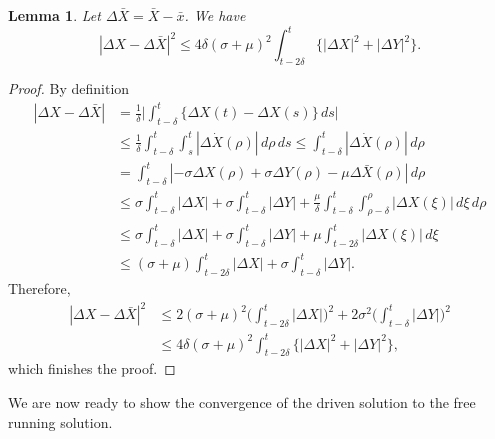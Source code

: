 \documentclass[master,tocprelim,12pt]{unrthesis}
\newtheorem{lemma}{Lemma}[chapter]
\theoremstyle{definition}
\newcommand{\del}{\delta}
\newcommand{\yourdelta}{{\Delta}}
\numberwithin{equation}{chapter}
\begin{document}
\begin{manuscript}
\begin{lemma}\label{tadiffit} 
Let $\yourdelta\bar X=\bar X-\bar x$.
We have
$$| \yourdelta X - \yourdelta\bar{X}|^2 \leq 4\delta(\sigma 
+ \mu)^2\displaystyle\int_{t-2\delta}^t\big\{
	|\yourdelta X|^2 + |\yourdelta Y|^2\big\}.$$ 
\end{lemma}
\begin{proof} By definition
\begin{align*}
    | \yourdelta X - \yourdelta\bar{X}| &
	= \frac{1}{\delta}\bigg|\int_{t-\delta}^t
		\big\{\yourdelta X(t)-\yourdelta X(s)\big\}\,ds \bigg| \\
    &\leq \frac{1}{\delta}\int_{t-\del}^t\int_s^t 
		|\yourdelta\dot{X}(\rho)|\,d\rho \,ds
    \leq \int_{t-\del}^t
		|\yourdelta\dot{X}(\rho)|\,d\rho \\
    &= \int_{t-\delta}^t|-\sigma\yourdelta X(\rho) 
	    + \sigma\yourdelta Y(\rho) - \mu\yourdelta\bar{X}(\rho)| \,d\rho \\
    &\leq \sigma \int_{t-\delta}^t|\yourdelta X| 
		+ \sigma \int_{t-\delta}^t|\yourdelta Y| 
	    + \frac{\mu}{\delta}\int_{t-\delta}^t
		\int_{\rho-\delta}^{\rho} |\yourdelta X(\xi)|
		\,d\xi \,d\rho \\
    &\leq \sigma \int_{t-\delta}^t|\yourdelta X| 
	    + \sigma \int_{t-\delta}^t|\yourdelta Y| 
		+ \mu\int_{t-2\delta}^t |\yourdelta X(\xi) | \,d\xi \\
    &\leq (\sigma + \mu)\displaystyle\int_{t-2\delta}^t|\yourdelta X| 
    + \sigma\int_{t-\delta}^t|\yourdelta Y|.
\end{align*}
Therefore,
\begin{align*}
    | \yourdelta X - \yourdelta\bar{X}|^2 &\leq 2(\sigma 
    + \mu)^2\bigg(\displaystyle\int_{t-2\delta}^t|\yourdelta X|\bigg)^2 
    + 2\sigma^2\bigg(\int_{t-\delta}^t|\yourdelta Y|\bigg)^2\\
    &\leq 4\delta(\sigma + \mu)^2\int_{t-2\delta}^t 
		\big\{|\yourdelta X|^2 + |\yourdelta Y|^2\big\},
\end{align*}
which finishes the proof.
\end{proof}

We are now ready to show the convergence of the driven solution
to the free running solution.


\end{manuscript}
\end{document}
